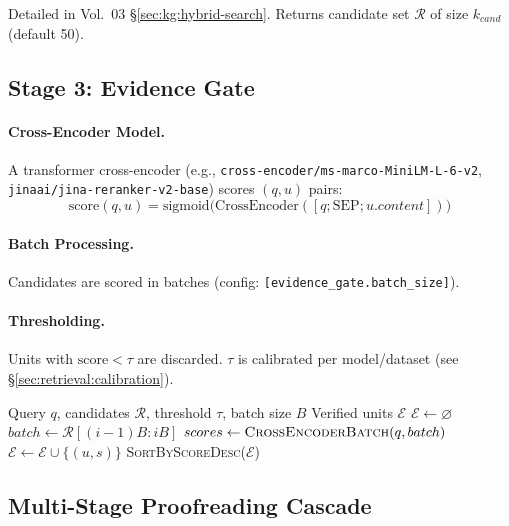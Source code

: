Detailed in Vol.~03 \S\ref{sec:kg:hybrid-search}. Returns candidate set $\mathcal{R}$ of size $k_{cand}$ (default 50).

\subsection{Stage 3: Evidence Gate}
\label{sec:retrieval:evidence-gate-stage3}

\paragraph{Cross-Encoder Model.}
A transformer cross-encoder (e.g., \texttt{cross-encoder/ms-marco-MiniLM-L-6-v2}, \texttt{jinaai/jina-reranker-v2-base}) scores $(q, u)$ pairs:
\begin{equation}
\text{score}(q, u) = \text{sigmoid}\big(\text{CrossEncoder}([q; \text{SEP}; u.content])\big)
\end{equation}

\paragraph{Batch Processing.}
Candidates are scored in batches (config: \texttt{[evidence\_gate.batch\_size]}).

\paragraph{Thresholding.}
Units with $\text{score} < \tau$ are discarded. $\tau$ is calibrated per model/dataset (see \S\ref{sec:retrieval:calibration}).

\begin{algorithm}[H]
\caption{Evidence Gate}
\label{alg:evidence-gate}
\begin{algorithmic}[1]
\Require Query $q$, candidates $\mathcal{R}$, threshold $\tau$, batch size $B$
\Ensure Verified units $\mathcal{E}$
\State $\mathcal{E} \gets \varnothing$
  \State $batch \gets \mathcal{R}[(i-1)B : iB]$
  \State $scores \gets \textsc{CrossEncoderBatch}(q, batch)$
      \State $\mathcal{E} \gets \mathcal{E} \cup \{(u, s)\}$
    \EndIf
  \EndFor
\EndFor
\State \Return \textsc{SortByScoreDesc}($\mathcal{E}$)
\end{algorithmic}
\end{algorithm}

\subsection{Multi-Stage Proofreading Cascade}
\label{sec:retrieval:proofreading}


